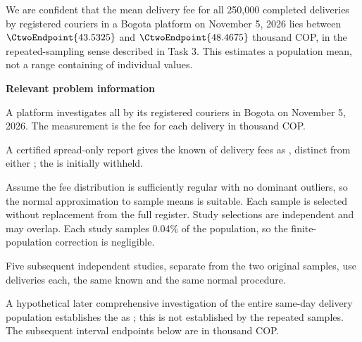We are  confident that the mean delivery fee for all 250,000 completed deliveries by registered couriers in a Bogota platform on November 5, 2026 lies between $\CtwoEndpoint{43.5325}$ and $\CtwoEndpoint{48.4675}$ thousand COP, in the repeated-sampling sense described in Task 3. This estimates a population mean, not a range containing  of individual values.

\secInicio[][sec:p3]

\clearpage



\textbf{Relevant problem information}

\begin{probleminfoexcerpt}
A platform investigates all    by its registered couriers in Bogota on November 5, 2026. The measurement is the fee for each delivery in thousand COP.
\end{probleminfoexcerpt}

\begin{probleminfoexcerpt}
A certified spread-only report gives the known    of delivery fees as   , distinct from either   ; the   is initially withheld.
\end{probleminfoexcerpt}

\begin{probleminfoexcerpt}
Assume the fee distribution is sufficiently regular with no dominant outliers, so the normal approximation to sample means is suitable. Each sample is selected without replacement from the full register. Study selections are independent and may overlap. Each study samples 0.04\% of the population, so the finite-population correction is negligible.
\end{probleminfoexcerpt}

\begin{probleminfoexcerpt}
Five subsequent independent studies, separate from the two original samples, use  deliveries each, the same known    and the same  normal procedure.
\end{probleminfoexcerpt}

\begin{probleminfoexcerpt}
A hypothetical later comprehensive investigation of the entire same-day delivery population establishes the   as   ; this is not established by the repeated samples. The subsequent interval endpoints below are in thousand COP.
\end{probleminfoexcerpt}


